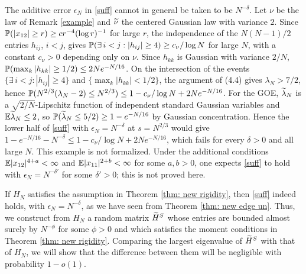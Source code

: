 \begin{rem} \label{rem: additive error}
The additive error $\epsilon_N$ in \eqref{suff} cannot in general be taken to be $N^{-\delta}$. Let $\nu$ be the law of Remark \ref{example} and $\widetilde\nu$ the centered Gaussian law with variance $2$. Since $\mathbb{P}(|x_{12}|\ge r)\ge c r^{-4}(\log r)^{-1}$ for large $r$, the independence of the $N(N-1)/2$ entries $h_{ij}$, $i<j$, gives $\mathbb{P}(\exists\, i<j: |h_{ij}|\ge4)\ge c_\nu/\log N$ for large $N$, with a constant $c_\nu>0$ depending only on $\nu$. Since $h_{kk}$ is Gaussian with variance $2/N$, $\mathbb{P}(\max_k|h_{kk}|\ge1/2)\le 2Ne^{-N/16}$. On the intersection of the events $\{\exists\, i<j: |h_{ij}|\ge4\}$ and $\{\max_k|h_{kk}|<1/2\}$, the argument of (4.4) gives $\lambda_N>7/2$, hence $\mathbb{P}(N^{2/3}(\lambda_N-2)\le N^{2/3})\le 1-c_\nu/\log N+2Ne^{-N/16}$. For the GOE, $\widetilde\lambda_N$ is a $\sqrt{2/N}$-Lipschitz function of independent standard Gaussian variables and $\mathbb{E}\widetilde\lambda_N\le2$, so $\mathbb{P}(\widetilde\lambda_N\le5/2)\ge1-e^{-N/16}$ by Gaussian concentration. Hence the lower half of \eqref{suff} with $\epsilon_N=N^{-\delta}$ at $s=N^{2/3}$ would give $1-e^{-N/16}-N^{-\delta}\le1-c_\nu/\log N+2Ne^{-N/16}$, which fails for every $\delta>0$ and all large $N$. This example is not formalized. Under the additional conditions $\mathbb{E}|x_{12}|^{4+a}<\infty$ and $\mathbb{E}|x_{11}|^{2+b}<\infty$ for some $a,b>0$, one expects \eqref{suff} to hold with $\epsilon_N=N^{-\delta'}$ for some $\delta'>0$; this is not proved here.
\end{rem}

If $H_N$ satisfies the assumption in Theorem \ref{thm: new rigidity}, then \eqref{suff} indeed holds, with $\epsilon_N=N^{-\delta}$, as we have seen from Theorem \ref{thm: new edge un}. Thus, we construct from $H_N$ a random matrix $\widetilde H^S$ whose entries are bounded almost surely by $N^{-\phi}$ for some $\phi>0$ and which satisfies the moment conditions in Theorem \ref{thm: new rigidity}. Comparing the largest eigenvalue of $\widetilde H^S$ with that of $H_N$, we will show that the difference between them will be negligible with probability $1 - o(1)$.

